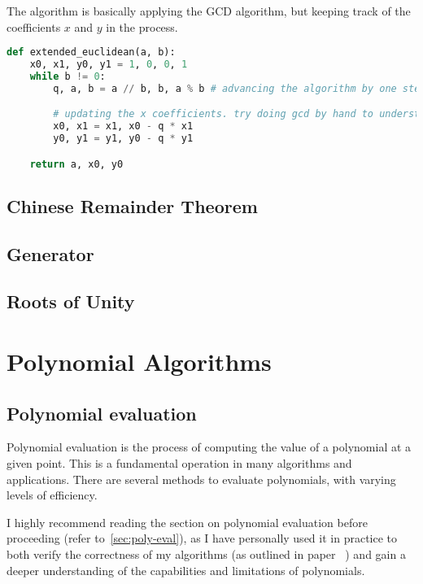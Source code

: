 The algorithm is basically applying the GCD algorithm, but keeping track of the coefficients
$x$ and $y$ in the process.

\begin{lstlisting}[language=Python,
  caption={Extended Euclidean Algorithm in python}
]
def extended_euclidean(a, b):
    x0, x1, y0, y1 = 1, 0, 0, 1
    while b != 0:
        q, a, b = a // b, b, a % b # advancing the algorithm by one step.

        # updating the x coefficients. try doing gcd by hand to understand this.
        x0, x1 = x1, x0 - q * x1 
        y0, y1 = y1, y0 - q * y1

    return a, x0, y0

\end{lstlisting}



\section{Chinese Remainder Theorem}

\section{Generator}

\section{Roots of Unity}



\chapter{Polynomial Algorithms}\label{polynomials}

\section{Polynomial evaluation}
Polynomial evaluation is the process of computing the value of a polynomial at a given point.
This is a fundamental operation in many algorithms and applications. 
There are several methods to evaluate polynomials, with varying levels of efficiency.

I highly recommend reading the section on polynomial evaluation before 
proceeding (refer to~\ref{sec:poly-eval}), as I have personally used it in 
practice to both verify the correctness of my algorithms (as outlined
 in paper~\cite{SPIR} ) and gain a deeper 
 understanding of the capabilities and limitations of polynomials.

